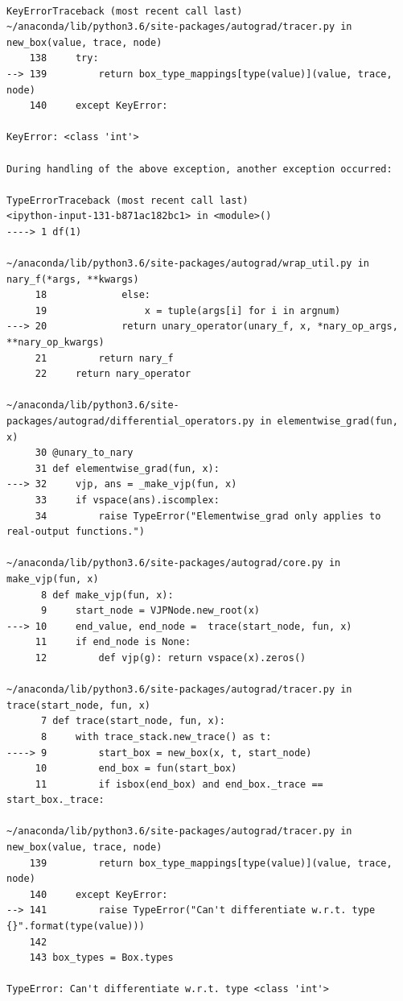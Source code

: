 \documentclass[11pt]{article}
\begin{document}
\begin{verbatim}

KeyErrorTraceback (most recent call last)
~/anaconda/lib/python3.6/site-packages/autograd/tracer.py in new_box(value, trace, node)
    138     try:
--> 139         return box_type_mappings[type(value)](value, trace, node)
    140     except KeyError:

KeyError: <class 'int'>

During handling of the above exception, another exception occurred:

TypeErrorTraceback (most recent call last)
<ipython-input-131-b871ac182bc1> in <module>()
----> 1 df(1)

~/anaconda/lib/python3.6/site-packages/autograd/wrap_util.py in nary_f(*args, **kwargs)
     18             else:
     19                 x = tuple(args[i] for i in argnum)
---> 20             return unary_operator(unary_f, x, *nary_op_args, **nary_op_kwargs)
     21         return nary_f
     22     return nary_operator

~/anaconda/lib/python3.6/site-packages/autograd/differential_operators.py in elementwise_grad(fun, x)
     30 @unary_to_nary
     31 def elementwise_grad(fun, x):
---> 32     vjp, ans = _make_vjp(fun, x)
     33     if vspace(ans).iscomplex:
     34         raise TypeError("Elementwise_grad only applies to real-output functions.")

~/anaconda/lib/python3.6/site-packages/autograd/core.py in make_vjp(fun, x)
      8 def make_vjp(fun, x):
      9     start_node = VJPNode.new_root(x)
---> 10     end_value, end_node =  trace(start_node, fun, x)
     11     if end_node is None:
     12         def vjp(g): return vspace(x).zeros()

~/anaconda/lib/python3.6/site-packages/autograd/tracer.py in trace(start_node, fun, x)
      7 def trace(start_node, fun, x):
      8     with trace_stack.new_trace() as t:
----> 9         start_box = new_box(x, t, start_node)
     10         end_box = fun(start_box)
     11         if isbox(end_box) and end_box._trace == start_box._trace:

~/anaconda/lib/python3.6/site-packages/autograd/tracer.py in new_box(value, trace, node)
    139         return box_type_mappings[type(value)](value, trace, node)
    140     except KeyError:
--> 141         raise TypeError("Can't differentiate w.r.t. type {}".format(type(value)))
    142
    143 box_types = Box.types

TypeError: Can't differentiate w.r.t. type <class 'int'>
\end{verbatim}
\end{document}

